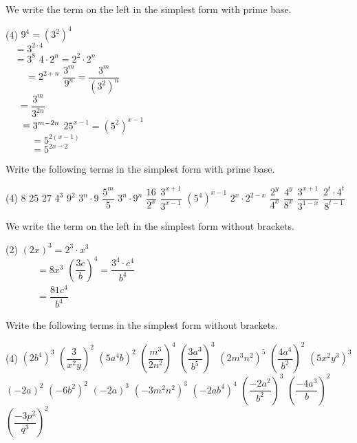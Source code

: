 \begin{example}
	We write the term on the left in the simplest form with prime base.
	\begin{tasks}(4)
		\task $9^4=\left(3^2\right)^4$ \\[4pt]
		$\phantom{9^4}=3^{2\cdot 4}$ \\[4pt]
		$\phantom{9^4}=3^8$
		\task $4\cdot 2^n=2^2\cdot 2^n$ \\[4pt]
		$\phantom{4\cdot 2^n}=2^{2+n}$
		\task $\dfrac{3^m}{9^n}=\dfrac{3^m}{\left(3^2\right)^n}$ \\[4pt]
		$\phantom{\dfrac{3^m}{9^n}}=\dfrac{3^m}{3^{2n}}$ \\[4pt]
		$\smash{\phantom{\dfrac{3^m}{9^n}}}=3^{m-2n}$
		\task $25^{x-1}=\left(5^2\right)^{x-1}$ \\[4pt]
		$\phantom{25^{x-1}}=5^{2\left(x-1\right)}$ \\[4pt]
		$\phantom{25^{x-1}}=5^{2x-2}$
	\end{tasks}
\end{example}
\begin{exercise}
	Write the following terms in the simplest form with prime base.
	\begin{tasks}(4)
		\task $8$ \task $25$ \task $27$ \task $4^3$
		\task $9^2$ \task $3^n\cdot 9$ \task $\dfrac{5^m}{5}$ \task $3^n\cdot 9^n$
		\task $\dfrac{16}{2^x}$ \task $\dfrac{3^{x+1}}{3^{x-1}}$ \task $\left(5^4\right)^{x-1}$ \task $2^x\cdot 2^{2-x}$
		\task $\dfrac{2^y}{4^x}$ \task $\dfrac{4^y}{8^x}$ \task $\dfrac{3^{x+1}}{3^{1-x}}$ \task $\dfrac{2^t\cdot 4^t}{8^{t-1}}$
	\end{tasks}
\end{exercise}
\begin{example}
	We write the term on the left in the simplest form without brackets.
	\begin{tasks}(2)
		\task $\left(2x\right)^3=2^3\cdot x^3$ \\ $\phantom{\left(2x\right)^3}=8x^3$
		\task $\left(\dfrac{3c}{b}\right)^4=\dfrac{3^4\cdot c^4}{b^4}$ \\
		$\phantom{\left(\dfrac{3c}{b}\right)^4}=\dfrac{81c^4}{b^4}$
	\end{tasks}
\end{example}
\begin{exercise}
	Write the following terms in the simplest form without brackets.
	\begin{tasks}(4)
		\task $\left(2b^4\right)^3$ \task $\left(\dfrac{3}{x^2y}\right)^2$
		\task $\left(5a^4b\right)^2$ \task $\left(\dfrac{m^3}{2n^2}\right)^4$
		\task $\left(\dfrac{3a^3}{b^5}\right)^3$ \task $\left(2m^3n^2\right)^5$
		\task $\left(\dfrac{4a^4}{b^2}\right)^2$ \task $\left(5x^2y^3\right)^3$
		\task $\left(-2a\right)^2$ \task $\left(-6b^2\right)^2$
		\task $\left(-2a\right)^3$ \task $\left(-3m^2n^2\right)^3$
		\task $\left(-2ab^4\right)^4$ \task $\left(\dfrac{-2a^2}{b^2}\right)^3$
		\task $\left(\dfrac{-4a^3}{b}\right)^2$ \task $\left(\dfrac{-3p^2}{q^3}\right)^2$
	\end{tasks}
\end{exercise}
